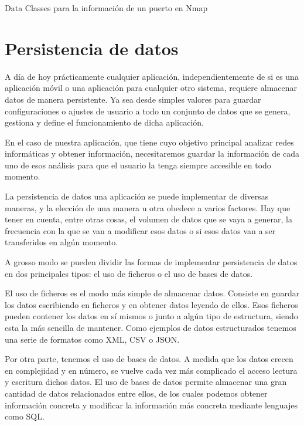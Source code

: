 \begin{listing}[H]
	\caption{Data Classes para la información de un puerto en Nmap}
	
	\label{code:nmapPort}
\end{listing}

\section{Persistencia de datos}

A día de hoy prácticamente cualquier aplicación, independientemente de si es una aplicación móvil o una aplicación para cualquier otro sistema, requiere almacenar datos de manera persistente. Ya sea desde simples valores para guardar configuraciones o ajustes de usuario a todo un conjunto de datos que se genera, gestiona y define el funcionamiento de dicha aplicación.

En el caso de nuestra aplicación, que tiene cuyo objetivo principal analizar redes informáticas y obtener información, necesitaremos guardar la información de cada uno de esos análisis para que el usuario la tenga siempre accesible en todo momento.

La persistencia de datos una aplicación se puede implementar de diversas maneras, y la elección de una manera u otra obedece a varios factores. Hay que tener en cuenta, entre otras cosas, el volumen de datos que se vaya a generar, la frecuencia con la que se van a modificar esos datos o si esos datos van a ser transferidos en algún momento.

A grosso modo se pueden dividir las formas de implementar persistencia de datos en dos principales tipos: el uso de ficheros o el uso de bases de datos.

El uso de ficheros es el modo más simple de almacenar datos. Consiste en guardar los datos escribiendo en ficheros y en obtener datos leyendo de ellos. Esos ficheros pueden contener los datos en sí mismos o junto a algún tipo de estructura, siendo esta la más sencilla de mantener. Como ejemplos de datos estructurados tenemos una serie de formatos como XML, CSV o JSON.

Por otra parte, tenemos el uso de bases de datos. A medida que los datos crecen en complejidad y en número, se vuelve cada vez más complicado el acceso lectura y escritura dichos datos. El uso de bases de datos permite almacenar una gran cantidad de datos relacionados entre ellos, de los cuales podemos obtener información concreta y modificar la información más concreta mediante lenguajes como SQL.

